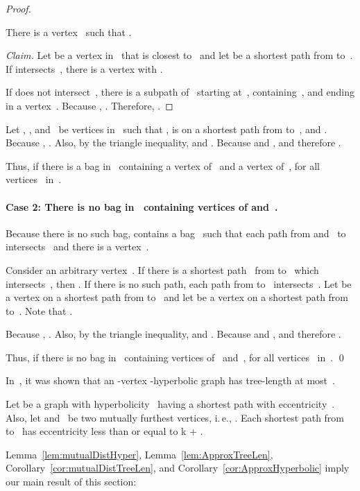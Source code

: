 \documentclass[10pt]{llncs}
\makeatletter
\newcommand{\ie}{i.\,e.\@ifnextchar{,}{}{~}}
\DeclareRobustCommand{\qedClaim}
{\ifmmode \lozenge \else \leavevmode\unskip\penalty9999 \hbox{}\nobreak\hfill \quad\hbox{}\fi }
\makeatother
\begin{document}
\begin{proof}
\begin{claim}
There is a vertex~ such that .
\end{claim}

\begin{proof}
    [Claim]
Let  be a vertex in~ that is closest to~ and let  be a shortest path from  to~.
If  intersects~, there is a vertex  with .

If  does not intersect~, there is a subpath of~ starting at~, containing~, and ending in a vertex~.
Because , .
Therefore, .
\qedClaim
\end{proof}

Let , , and~ be vertices in~ such that ,  is on a shortest path from  to~, and .
Because , .
Also, by the triangle inequality,  and .
Because  and ,  and therefore .

Thus, if there is a bag in~ containing a vertex of~ and a vertex of~,  for all vertices~ in~.

\paragraph{Case 2: There is no bag in~ containing vertices of  and~.}
Because there is no such bag,  contains a bag~ such that each path from  and~ to~ intersects~ and there is a vertex~.

Consider an arbitrary vertex~.
If there is a shortest path~ from  to~ which intersects~, then .
If there is no such path, each path from  to~ intersects~.
Let  be a vertex on a shortest path from  to~ and let  be a vertex on a shortest path from  to~.
Note that .

Because , .
Also, by the triangle inequality,  and .
Because  and ,  and therefore .

Thus, if there is no bag in~ containing vertices of~ and~,  for all vertices~ in~.
\qed
\end{proof}

In~\cite{CheDraEstHab2008}, it was shown that an -vertex -hyperbolic graph has tree-length at most~.

\begin{corollary}
    \label{cor:ApproxHyperbolic}
Let  be a graph with hyperbolicity~ having a shortest path with eccentricity~.
Also, let  and~ be two mutually furthest vertices, \ie, .
Each shortest path from  to~ has eccentricity less than or equal to k + .
\end{corollary}

Lemma~\ref{lem:mutualDistHyper}, Lemma~\ref{lem:ApproxTreeLen}, Corollary~\ref{cor:mutualDistTreeLen}, and Corollary~\ref{cor:ApproxHyperbolic} imply our main result of this section:
\end{document}
